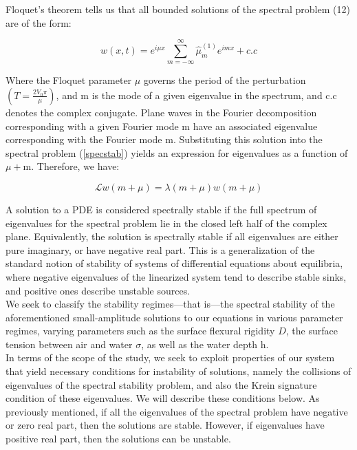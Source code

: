 \documentclass{article}
\begin{document}
Floquet's theorem tells us that all bounded solutions of the spectral problem (12) are of the form: 

\begin{equation} \label{floquet}
  w(x,t) = e^{i\mu x} \sum_{m=-\infty}^{\infty} \hat\mu^{(1)}_m e^{imx} + c.c
\end{equation}

Where the Floquet parameter \(\mu\) governs the period of the perturbation \((T = \frac{2 V_0\pi}{\mu})\), and m is the mode of a given eigenvalue in the spectrum, and c.c denotes the complex conjugate. Plane waves in the Fourier decomposition corresponding with a given Fourier mode m have an associated eigenvalue corresponding with the Fourier mode m.  Substituting this solution into the spectral problem (\ref{specstab}) yields an expression for eigenvalues as a function of \(\mu +\)m. Therefore, we have:

\begin{equation} \label{eq1}
  \mathscr{L}w(m+\mu) =   \lambda(m+\mu) w(m+\mu)
\end{equation}

A solution to a PDE is considered spectrally stable if the full spectrum of eigenvalues for the spectral problem lie in the closed left half of the complex plane. Equivalently, the solution is spectrally stable if all eigenvalues are either pure imaginary, or have negative real part. This is a generalization of the standard notion of stability of systems of differential equations about equilibria, where negative eigenvalues of the linearized system tend to describe stable sinks, and positive ones describe unstable sources.\\

We seek to classify the stability regimes—that is—the spectral stability of the aforementioned small-amplitude solutions to our equations in various parameter regimes, varying parameters such as the surface flexural rigidity \(D\), the surface tension between air and water \(\sigma\), as well as the water depth h. \\



In terms of the scope of the study, we seek to exploit properties of our system that yield necessary conditions for instability of solutions, namely the collisions of eigenvalues of the spectral stability problem, and also the Krein signature condition of these eigenvalues. We will describe these conditions below. As previously mentioned, if all the eigenvalues of the spectral problem have negative or zero real part, then the solutions are stable. However, if eigenvalues have positive real part, then the solutions can be unstable.\\
\end{document}
